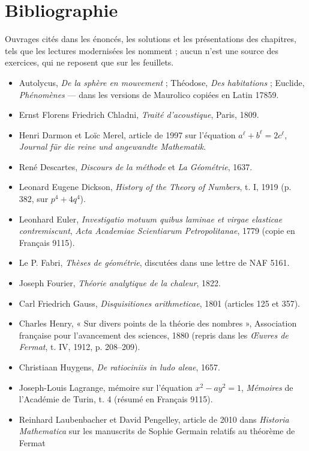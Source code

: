 \documentclass[11pt,a4paper]{article}
\begin{document}
\section*{Bibliographie}

Ouvrages cités dans les énoncés, les solutions et les présentations des chapitres,
tels que les lectures modernisées les nomment ; aucun n'est une source des
exercices, qui ne reposent que sur les feuillets.

\begin{itemize}
\item Autolycus, \emph{De la sphère en mouvement} ; Théodose, \emph{Des habitations} ;
  Euclide, \emph{Phénomènes} --- dans les versions de Maurolico copiées en
  Latin 17859.
\item Ernst Florens Friedrich Chladni, \emph{Traité d'acoustique}, Paris, 1809.
\item Henri Darmon et Loïc Merel, article de 1997 sur l'équation
  $a^\ell + b^\ell = 2c^\ell$, \emph{Journal für die reine und angewandte Mathematik}.
\item René Descartes, \emph{Discours de la méthode} et \emph{La Géométrie},
  1637.
\item Leonard Eugene Dickson, \emph{History of the Theory of Numbers}, t. I, 1919
  (p. 382, sur $p^4 + 4q^4$).
\item Leonhard Euler, \emph{Investigatio motuum quibus laminae et virgae elasticae
  contremiscunt}, \emph{Acta Academiae Scientiarum Petropolitanae}, 1779 (copie en
  Français 9115).
\item Le P. Fabri, \emph{Thèses de géométrie}, discutées dans une lettre de NAF 5161.
\item Joseph Fourier, \emph{Théorie analytique de la chaleur}, 1822.
\item Carl Friedrich Gauss, \emph{Disquisitiones arithmeticae}, 1801
  (articles 125 et 357).
\item Charles Henry, « Sur divers points de la théorie des nombres », Association
  française pour l'avancement des sciences, 1880 (repris dans les \emph{Œuvres de
  Fermat}, t. IV, 1912, p. 208--209).
\item Christiaan Huygens, \emph{De ratiociniis in ludo aleae}, 1657.
\item Joseph-Louis Lagrange, mémoire sur l'équation $x^2 - ay^2 = 1$, \emph{Mémoires}
  de l'Académie de Turin, t. 4 (résumé en Français 9115).
\item Reinhard Laubenbacher et David Pengelley, article de 2010 dans \emph{Historia
  Mathematica} sur les manuscrits de Sophie Germain relatifs au théorème de Fermat

\end{itemize}
\end{document}
